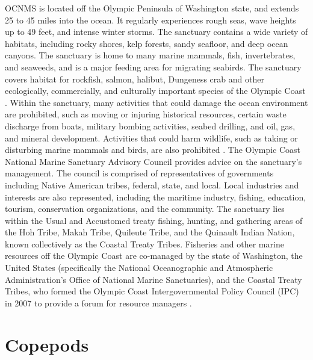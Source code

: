 \documentclass[12pt,twoside]{reedthesis}
\begin{document}
OCNMS is located off the Olympic Peninsula of Washington state, and extends 25 to 45 miles into the ocean. It regularly experiences rough seas, wave heights up to 49 feet, and intense winter storms. The sanctuary contains a wide variety of habitats, including rocky shores, kelp forests, sandy seafloor, and deep ocean canyons. The sanctuary is home to many marine mammals, fish, invertebrates, and seaweeds, and is a major feeding area for migrating seabirds. The sanctuary covers habitat for rockfish, salmon, halibut, Dungeness crab and other ecologically, commercially, and culturally important species of the Olympic Coast \autocite{OfficeofNationalMarineSanctuaries2022}.  Within the sanctuary, many activities that could damage the ocean environment are prohibited, such as moving or injuring historical resources, certain waste discharge from boats, military bombing activities, seabed drilling, and oil, gas, and mineral development. Activities that could harm wildlife, such as taking or disturbing marine mammals and birds, are also prohibited \autocite{15CFRPart1995}. The Olympic Coast National Marine Sanctuary Advisory Council provides advice on the sanctuary's management. The council is comprised of representatives of governments including Native American tribes, federal, state, and local. Local industries and interests are also represented, including the maritime industry, fishing, education, tourism, conservation organizations, and the community. The sanctuary lies within the Usual and Accustomed treaty fishing, hunting, and gathering areas of the Hoh Tribe, Makah Tribe, Quileute Tribe, and the Quinault Indian Nation, known collectively as the Coastal Treaty Tribes. Fisheries and other marine resources off the Olympic Coast are co-managed by the state of Washington, the United States (specifically the National Oceanographic and Atmospheric Administration's Office of National Marine Sanctuaries), and the Coastal Treaty Tribes, who formed the Olympic Coast Intergovernmental Policy Council (IPC) in 2007 to provide a forum for resource managers \autocite{IntergovernmentalPolicyCouncil}.


\section{Copepods}
\end{document}
